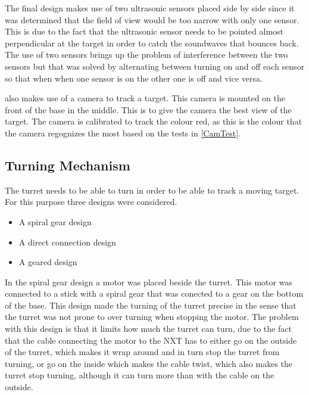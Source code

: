 The final design makes use of two ultrasonic sensors placed side by side since
it was determined that the field of view would be too narrow with only one
sensor. This is due to the fact that the ultrasonic sensor needs to be pointed
almost perpendicular at the target in order to catch the soundwaves that bounces
back. The use of two sensors brings up the problem of interference between the
two sensors but that was solved by alternating between turning on and off each
sensor so that when when one sensor is on the other one is off and vice
versa.\nl

\name also makes use of a camera to track a target. This camera is mounted on
the front of the base in the middle. This is to give the camera the best
view of the target. The camera is calibrated to track the colour red, as this
is the colour that the camera regognizes the most based on the tests in \autoref{CamTest}.

\subsection{Turning Mechanism}
The turret needs to be able to turn in order to be able to track a moving
target. For this purpose three designs were considered. 

\begin{itemize}
  \item A spiral gear design
  \item A direct connection design
  \item A geared design
\end{itemize}

In the spiral gear design a motor was placed beside the turret. This motor was
connected to a stick with a spiral gear that was conected to a gear on the bottom of the base. This design
made the turning of the turret precise in the sense that the turret was not
prone to over turning when stopping the motor. The problem with this design is
that it limits how much the turret can turn, due to the fact that the cable
connecting the motor to the NXT has to either go on the outside of the turret,
which makes it wrap around and in turn stop the turret from turning, or go on
the inside which makes the cable twist, which also makes the turret stop
turning, although it can turn more than with the cable on the outside.\nl

